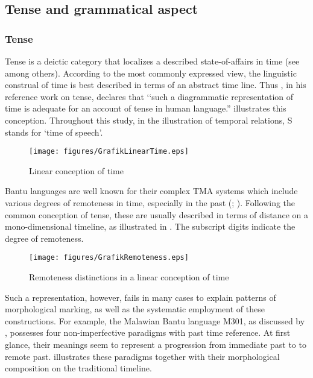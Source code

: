 \subsection{Tense and grammatical aspect}\label{TenseAspect}
\subsubsection{Tense}\label{Tense}
Tense is a deictic category that localizes a described state-of-affairs in time (see \citealt{ComrieB1985} among others). According to the most commonly expressed view, the linguistic construal of time is best described in terms of an abstract time line. Thus \citet[2]{ComrieB1985}, in his reference work on tense, declares that \lq\lq such a diagrammatic representation of time is adequate for an account of tense in human language.”  illustrates this conception. Throughout this study, in the illustration of temporal relations, S stands for \lq time of speech’.

\begin{figure}[h]
\begin{center}
\texttt{[image: figures/GrafikLinearTime.eps]}
\caption{Linear conception of time}
\label{FigureLinearConceptionOfTime}
\end{center}
\end{figure}

Bantu languages are well known for their complex TMA systems which include various degrees of remoteness in time, especially in the past (\citealt[185]{DahlOe1985}; \citealt[21f]{NurseD2008}). Following the common conception of tense, these are usually described in terms of distance on a mono-dimensional timeline, as illustrated in . The subscript digits indicate the degree of remoteness.

\begin{figure}[h]
\begin{center}
\texttt{[image: figures/GrafikRemoteness.eps]}
\caption{Remoteness distinctions in a linear conception of time}
\label{FigureRemoteness}
\end{center}
\end{figure}

Such a representation, however, fails in many cases to explain patterns of morphological marking, as well as the systematic employment of these constructions. For example, the Malawian Bantu language  M301, as discussed by \citet[93f]{KershnerT2002}, possesses four non-imperfective paradigms with past time reference. At first glance, their meanings seem to represent a progression from immediate past to to remote past.  illustrates these paradigms together with their morphological composition on the traditional timeline.

